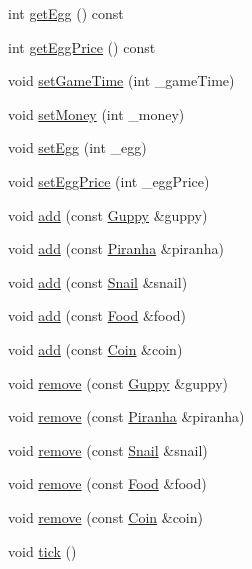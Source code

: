 \begin{DoxyCompactItemize}
\item 
int \mbox{\hyperlink{class_aquarium_afeeff766ee2f6e30127f287e8ff98094}{get\+Egg}} () const
\item 
int \mbox{\hyperlink{class_aquarium_ad35796994738d4b6f2d7ffd5660b52ef}{get\+Egg\+Price}} () const
\item 
void \mbox{\hyperlink{class_aquarium_a93d5b161e95bf64fc36642d3ec93ca48}{set\+Game\+Time}} (int \+\_\+game\+Time)
\item 
void \mbox{\hyperlink{class_aquarium_a6a29945548af2f7cdf9b6cb07e83b41f}{set\+Money}} (int \+\_\+money)
\item 
void \mbox{\hyperlink{class_aquarium_aa9398d7691f5c443459d4b38a9be5483}{set\+Egg}} (int \+\_\+egg)
\item 
void \mbox{\hyperlink{class_aquarium_a08863cdaa6016dccc8e35be9171be652}{set\+Egg\+Price}} (int \+\_\+egg\+Price)
\item 
void \mbox{\hyperlink{class_aquarium_a320872320862a83e64bc85b895efc21f}{add}} (const \mbox{\hyperlink{class_guppy}{Guppy}} \&guppy)
\item 
void \mbox{\hyperlink{class_aquarium_ad9d2de6ec229fdcdec009bc9a641fe98}{add}} (const \mbox{\hyperlink{class_piranha}{Piranha}} \&piranha)
\item 
void \mbox{\hyperlink{class_aquarium_a9189f6891d0f9012515de3d7e4e765fe}{add}} (const \mbox{\hyperlink{class_snail}{Snail}} \&snail)
\item 
void \mbox{\hyperlink{class_aquarium_a0eb7a1a387c68485088cbd7a161257cd}{add}} (const \mbox{\hyperlink{class_food}{Food}} \&food)
\item 
void \mbox{\hyperlink{class_aquarium_ade3137910efb46f7d47a86a1cff0716b}{add}} (const \mbox{\hyperlink{class_coin}{Coin}} \&coin)
\item 
void \mbox{\hyperlink{class_aquarium_a5db51e8b6e5401fcc4140c0c26c049ef}{remove}} (const \mbox{\hyperlink{class_guppy}{Guppy}} \&guppy)
\item 
void \mbox{\hyperlink{class_aquarium_a816328c7f4740a9747735d0bf0d17996}{remove}} (const \mbox{\hyperlink{class_piranha}{Piranha}} \&piranha)
\item 
void \mbox{\hyperlink{class_aquarium_aaa4e4751684ac4f0ea0f818b0ac0eb9c}{remove}} (const \mbox{\hyperlink{class_snail}{Snail}} \&snail)
\item 
void \mbox{\hyperlink{class_aquarium_add8721889913594c0da084d780406d68}{remove}} (const \mbox{\hyperlink{class_food}{Food}} \&food)
\item 
void \mbox{\hyperlink{class_aquarium_aa42e6fbc3cb8445f07875e5f8c127892}{remove}} (const \mbox{\hyperlink{class_coin}{Coin}} \&coin)
\item 
void \mbox{\hyperlink{class_aquarium_a99572f6fe551c4ae73ca5150f6e2f111}{tick}} ()
\end{DoxyCompactItemize}


